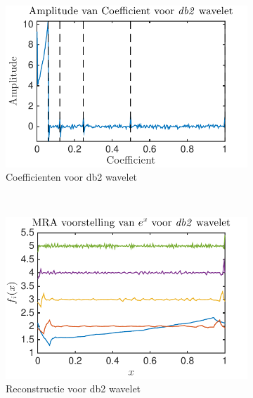 \begin{figure}
\begin{subfigure}[b]{0.4\textwidth}
        \includegraphics[width=\textwidth]{../src/denoising/db2_Noise/coef_exp_db2_4_noise_10}
        \caption{Coefficienten voor db2 wavelet}
    \end{subfigure}
    ~ %
    \begin{subfigure}[b]{0.4\textwidth}
        \includegraphics[width=\textwidth]{../src/denoising/db2_Noise/MRA_exp_db2_4_noise_10}
        \caption{Reconstructie voor db2 wavelet}
    \end{subfigure}
    \begin{subfigure}[b]{0.4\textwidth}

\end{subfigure}
\end{figure}
